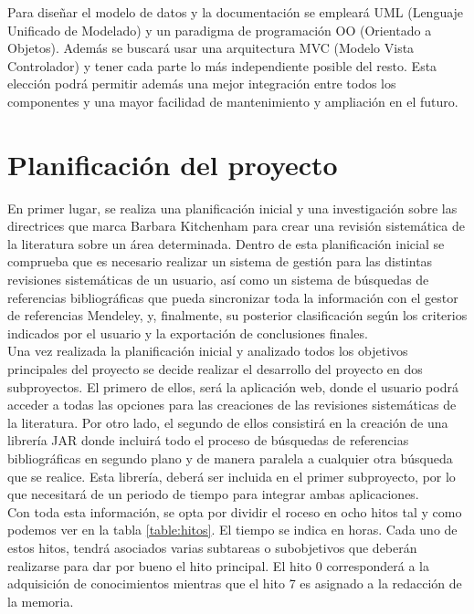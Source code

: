 Para diseñar el modelo de datos y la documentación se empleará UML (Lenguaje Unificado de Modelado) y un paradigma de programación OO (Orientado a Objetos). Además se buscará usar una arquitectura MVC (Modelo Vista Controlador) y tener cada parte lo más independiente posible del resto. Esta elección podrá permitir además una mejor integración entre todos los componentes y una mayor facilidad de mantenimiento y ampliación en el futuro.

\section{Planificación del proyecto}
En primer lugar, se realiza una planificación inicial y una investigación sobre las directrices que marca Barbara Kitchenham para crear una revisión sistemática de la literatura sobre un área determinada. Dentro de esta planificación inicial se comprueba que es necesario realizar un sistema de gestión para las distintas revisiones sistemáticas de un usuario, así como un sistema de búsquedas de referencias bibliográficas que pueda sincronizar toda la información con el gestor de referencias Mendeley, y, finalmente, su posterior clasificación según los criterios indicados por el usuario y la exportación de conclusiones finales.\\

Una vez realizada la planificación inicial y analizado todos los objetivos principales del proyecto se decide realizar el desarrollo del proyecto en dos subproyectos. El primero de ellos, será la aplicación web, donde el usuario podrá acceder a todas las opciones para las creaciones de las revisiones sistemáticas de la literatura. Por otro lado, el segundo de ellos consistirá en la creación de una librería JAR donde incluirá todo el proceso de búsquedas de referencias bibliográficas en segundo plano y de manera paralela a cualquier otra búsqueda que se realice. Esta librería, deberá ser incluida en el primer subproyecto, por lo que necesitará de un periodo de tiempo para integrar ambas aplicaciones.\\

Con toda esta información, se opta por dividir el roceso en ocho hitos tal y como podemos ver en la tabla \ref{table:hitos}. El tiempo se indica en horas. Cada uno de estos hitos, tendrá asociados varias subtareas o subobjetivos que deberán realizarse para dar por bueno el hito principal. El hito 0 corresponderá a la adquisición de conocimientos mientras que el hito 7 es asignado a la redacción de la memoria.\\

